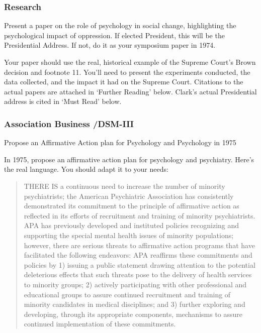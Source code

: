 \begin{refsection}
\subsubsection{Research}
\label{research}

\begin{writingtask}[Clark - 1974]\label{writingtask:clark}
Present a paper on the role of psychology in social change, highlighting the psychological impact of oppression. If elected President, this will be the Presidential Address. If not, do it as your symposium paper in 1974.
\end{writingtask}

Your paper should use the real, historical example of the Supreme Court’s Brown decision and footnote 11. You’ll need to present the experiments conducted, the data collected, and the impact it had on the Supreme Court. Citations to the actual papers are attached in ‘Further Reading’ below. Clark’s actual Presidential address is cited in ‘Must Read’ below.

\subsubsection{Association Business \slash  DSM-III}
\label{associationbusinessdsm-iii}

\begin{proposal}[Clark]\label{proposal:clark}Propose an Affirmative Action plan for Psychology and Psychology in 1975\end{proposal}

In 1975, propose an affirmative action plan for psychology and psychiatry. Here's the real language. You should adapt it to your needs:

\begin{quote}

THERE IS a continuous need to increase the number of minority psychiatrists; the American Psychiatric Association has consistently demonstrated its commitment to the principle of affirmative action as reflected in its efforts of recruitment and training of minority psychiatrists. APA has previously developed and instituted policies recognizing and supporting the special mental health issues of minority populations; however, there are serious threats to affirmative action programs that have facilitated the following endeavors: APA reaffirms these commitments and policies by 1) issuing a public statement drawing attention to the potential deleterious effects that such threats pose to the delivery of health services to minority groups; 2) actively participating with other professional and educational groups to assure continued recruitment and training of minority candidates in medical disciplines; and 3) further exploring and developing, through its appropriate components, mechanisms to assure continued implementation of these commitments.
\end{quote}


\end{refsection}
